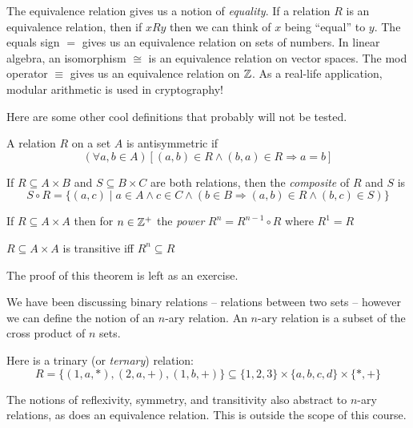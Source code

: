 \documentclass[main.tex]{subfiles}
\begin{document}
The equivalence relation gives us a notion of \textit{equality}. If a relation \(R\) is an equivalence relation, then if \(xRy\) then we can think of \(x\) being ``equal'' to \(y\). The equals sign \(=\) gives us an equivalence relation on sets of numbers. In linear algebra, an isomorphism \(\cong\) is an equivalence relation on vector spaces. The mod operator \(\equiv\) gives us an equivalence relation on \(\mathbb{Z}\). As a real-life application, modular arithmetic is used in cryptography!

Here are some other cool definitions that probably will not be tested.

\begin{defn}
	A relation \(R\) on a set \(A\) is antisymmetric if \[(\forall a,b \in A)[(a,b) \in R \land (b,a) \in R \Rightarrow a = b]\]
\end{defn}

\begin{defn}
	If \(R \subseteq A \times B\) and \(S \subseteq B \times C\) are both relations, then the \textit{composite} of \(R\) and \(S\) is \[S \circ R = \{(a,c) \mid a \in A \land c \in C \land (b \in B \Rightarrow (a,b) \in R \land (b,c) \in S)\}\]
\end{defn}

\begin{defn}
	If \(R \subseteq A \times A\) then for \(n \in \mathbb{Z}^+\) the \textit{power} \(R^n = R^{n-1} \circ R\) where \(R^1 = R\)
\end{defn}

\begin{thm}
	\label{relation-transitive-theorem}
	\(R \subseteq A \times A\) is transitive iff \(R^n \subseteq R\)
\end{thm}

The proof of this theorem is left as an exercise.

We have been discussing binary relations -- relations between two sets -- however we can define the notion of an \(n\)-ary relation. An \(n\)-ary relation is a subset of the cross product of \(n\) sets.

\begin{example}
	Here is a trinary (or \textit{ternary}) relation: \[R = \{(1,a,*), (2,a,+), (1,b,+)\} \subseteq \{1,2,3\} \times \{a,b,c,d\} \times \{*,+\}\]
\end{example}

The notions of reflexivity, symmetry, and transitivity also abstract to \(n\)-ary relations, as does an equivalence relation. This is outside the scope of this course.
\end{document}
